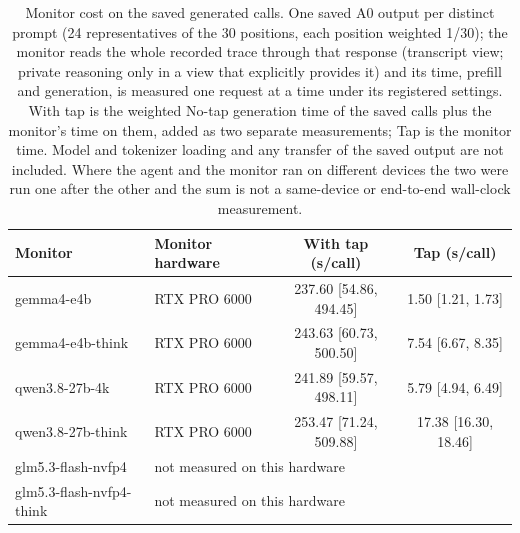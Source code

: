 \begin{table}[t]
\centering\footnotesize
\begin{tabular}{llcc}
\toprule
Monitor & Monitor hardware & With tap (s/call) & Tap (s/call) \\
\midrule
gemma4-e4b & RTX PRO 6000 & 237.60 [54.86, 494.45] & 1.50 [1.21, 1.73] \\
gemma4-e4b-think & RTX PRO 6000 & 243.63 [60.73, 500.50] & 7.54 [6.67, 8.35] \\
qwen3.8-27b-4k & RTX PRO 6000 & 241.89 [59.57, 498.11] & 5.79 [4.94, 6.49] \\
qwen3.8-27b-think & RTX PRO 6000 & 253.47 [71.24, 509.88] & 17.38 [16.30, 18.46] \\
glm5.3-flash-nvfp4 & \multicolumn{3}{l}{not measured on this hardware} \\
glm5.3-flash-nvfp4-think & \multicolumn{3}{l}{not measured on this hardware} \\
\bottomrule
\end{tabular}
\caption{Monitor cost on the saved generated calls. One saved A0 output per distinct prompt (24 representatives of the 30 positions, each position weighted 1/30); the monitor reads the whole recorded trace through that response (transcript view; private reasoning only in a view that explicitly provides it) and its time, prefill and generation, is measured one request at a time under its registered settings. With tap is the weighted No-tap generation time of the saved calls plus the monitor's time on them, added as two separate measurements; Tap is the monitor time. Model and tokenizer loading and any transfer of the saved output are not included. Where the agent and the monitor ran on different devices the two were run one after the other and the sum is not a same-device or end-to-end wall-clock measurement.}
\end{table}
